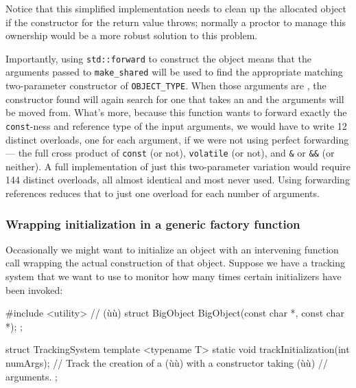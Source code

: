 \noindent Notice that this simplified implementation needs to clean up the allocated object if the
constructor for the return value throws; normally a 
proctor to manage this ownership would be a more robust solution to this
problem.

Importantly, using \lstinline!std::forward! to construct the object
means that the arguments passed to \lstinline!make_shared! will be used to
find the appropriate matching two-parameter constructor of
\lstinline!OBJECT_TYPE!. When those arguments are , the
constructor found will again search for one that takes an 
and the arguments will be moved from. What's more, because this function
wants to forward exactly the \lstinline!const!-ness and reference type of
the input arguments, we would have to write 12 distinct overloads, one for
each argument, if we were not using perfect forwarding --- the full cross
product of \lstinline!const! (or not), \lstinline!volatile! (or not), and
\lstinline!&! or \lstinline!&&! (or neither). A full
implementation of just this two-parameter variation would require 144
distinct overloads, all almost identical and most never
used. Using forwarding references reduces that to just one
overload for each number of arguments.

\subsubsection[Wrapping initialization in a generic factory function]{Wrapping initialization in a generic factory function}\label{wrapping-initialization-in-a-generic-factory-function}

Occasionally we might want to initialize an object with an intervening
function call wrapping the actual construction of that object. Suppose
we have a tracking system that we want to use to monitor how many times
certain initializers have been invoked:

\begin{emcppshiddenlisting}[emcppsbatch=e10]
#include <utility>      // (ù{}ù)
struct BigObject {
    BigObject(const char *, const char *);
};
\end{emcppshiddenlisting}
\begin{emcppslisting}[emcppsbatch=e10]
struct TrackingSystem
{
    template <typename T>
    static void trackInitialization(int numArgs);
        // Track the creation of a (ù{}ù) with a constructor taking (ù{}ù)
        // arguments.
};
\end{emcppslisting}

